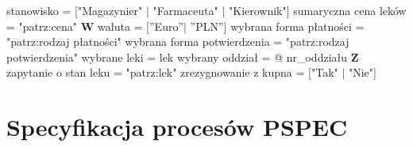 \documentclass[a4paper, 11pt]{article}
\begin{document}
	\noindent
	stanowisko = ["Magazynier" $|$ "Farmaceuta" $|$ "Kierownik"] \newline
	sumaryczna cena leków = "patrz:cena" \newline \newline
	\textbf{W} \newline \newline
	\noindent
	waluta = [''Euro''$|$ ''PLN''] \newline
	wybrana forma płatności = "patrz:rodzaj płatności" \newline
	wybrana forma potwierdzenia = "patrz:rodzaj potwierdzenia" \newline
	wybrane leki = {lek} \newline
	wybrany oddział = @ nr\_oddziału \newline \newline
	\textbf{Z} \newline \newline
	\noindent	
	zapytanie o stan leku = "patrz:lek" \newline
	zrezygnowanie z kupna = ["Tak" $|$ "Nie"] \newline \newline
	
	\section{Specyfikacja procesów PSPEC}
\end{document}
